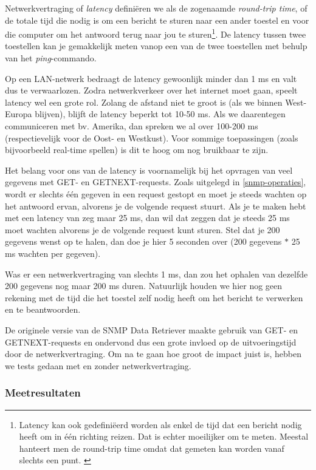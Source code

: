 Netwerkvertraging of \textit{latency} definiëren we als de zogenaamde \textit{round-trip time},
of de totale tijd die nodig is om een bericht te sturen naar een ander toestel en voor die computer om het antwoord terug naar jou te sturen\footnote{
	Latency kan ook gedefiniëerd worden als enkel de tijd dat een bericht nodig heeft om in één richting reizen.
	Dat is echter moeilijker om te meten. Meestal hanteert men de round-trip time omdat dat gemeten kan worden vanaf slechts een punt. \cite{latency-wiki}
}.
De latency tussen twee toestellen kan je gemakkelijk meten vanop een van de twee toestellen met behulp van het \textit{ping}-commando.

Op een LAN-netwerk bedraagt de latency gewoonlijk minder dan 1 ms en valt dus te verwaarlozen.
Zodra netwerkverkeer over het internet moet gaan, speelt latency wel een grote rol.
Zolang de afstand niet te groot is (als we binnen West-Europa blijven), blijft de latency beperkt tot 10-50 ms.
Als we daarentegen communiceren met bv. Amerika, dan spreken we al over 100-200 ms (respectievelijk voor de Oost- en Westkust).
Voor sommige toepassingen (zoals bijvoorbeeld real-time spellen) is dit te hoog om nog bruikbaar te zijn.

Het belang voor ons van de latency is voornamelijk bij het opvragen van veel gegevens met GET- en GETNEXT-requests.
Zoals uitgelegd in \cref{snmp-operaties}, wordt er slechts één gegeven in een request gestopt en
moet je steeds wachten op het antwoord ervan, alvorens je de volgende request stuurt.
Als je te maken hebt met een latency van zeg maar 25 ms, dan wil dat zeggen dat je steeds 25 ms moet wachten alvorens je de volgende request kunt sturen.
Stel dat je 200 gegevens wenst op te halen, dan doe je hier 5 seconden over (200 gegevens $*$ 25 ms wachten per gegeven).

Was er een netwerkvertraging van slechts 1 ms, dan zou het ophalen van dezelfde 200 gegevens nog maar 200 ms duren.
Natuurlijk houden we hier nog geen rekening met de tijd die het toestel zelf nodig heeft om het bericht te verwerken en te beantwoorden.

De originele versie van de SNMP Data Retriever maakte gebruik van GET- en GETNEXT-requests en ondervond dus een grote invloed op de uitvoeringstijd door de netwerkvertraging.
Om na te gaan hoe groot de impact juist is, hebben we tests gedaan met en zonder netwerkvertraging.

\subsubsection{Meetresultaten}

